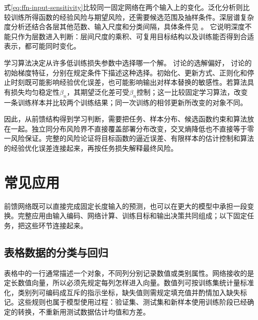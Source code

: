 式\eqref{eq:ffn-input-sensitivity}比较同一固定网络在两个输入上的变化。泛化分析则比较训练所得函数的经验风险与期望风险，还需要候选范围及抽样条件。深层谱复杂度分析还结合各层其他范数、输入尺度和分类间隔，具体条件见
。
它说明深度不能只作为层数进入判断：层间尺度的乘积、可复用目标结构以及训练能否得到合适表示，都可能同时变化。

学习算法决定从许多低训练损失参数中选择哪一个解。
讨论的选解偏好，
讨论的初始梯度特征，分别在规定条件下描述这种选择。初始化、更新方式、正则化和停止时刻既可能影响经验优化误差，也可能影响输出对样本替换的敏感性。若算法具有损失均匀稳定性$\beta_n$，其期望泛化差可受$\beta_n$控制；这一比较固定学习算法，改变一条训练样本并比较两个训练结果；同一次训练的相邻更新所改变的对象不同。

因此，从前馈结构得到学习判断，需要把任务、样本分布、候选函数约束和算法放在一起。独立同分布风险界不直接覆盖部署分布改变，交叉熵降低也不直接等于零一风险保证。完整的风险论证将目标函数的逼近误差、有限样本的估计控制和算法的经验优化误差连接起来，再按任务损失解释最终风险。

\section{常见应用}
\label{sec:ffn-applications}

前馈网络既可以直接完成固定长度输入的预测，也可以在更大的模型中承担一段变换。完整应用由输入编码、网络计算、训练目标和输出决策共同组成；以下固定任务，把这些环节连接起来。

\subsection{表格数据的分类与回归}
\label{sec:ffn-tabular}

表格中的一行通常描述一个对象，不同列分别记录数值或类别属性。网络接收的是定长数值向量，所以必须先规定每列怎样进入向量。数值列可按训练集统计量标准化，类别列可编码成互斥的指示坐标，缺失值则需规定填充值并酌情加入缺失标记。这些规则也属于模型使用过程：验证集、测试集和新样本使用训练阶段已经确定的转换，不重新用测试数据估计均值和方差。

